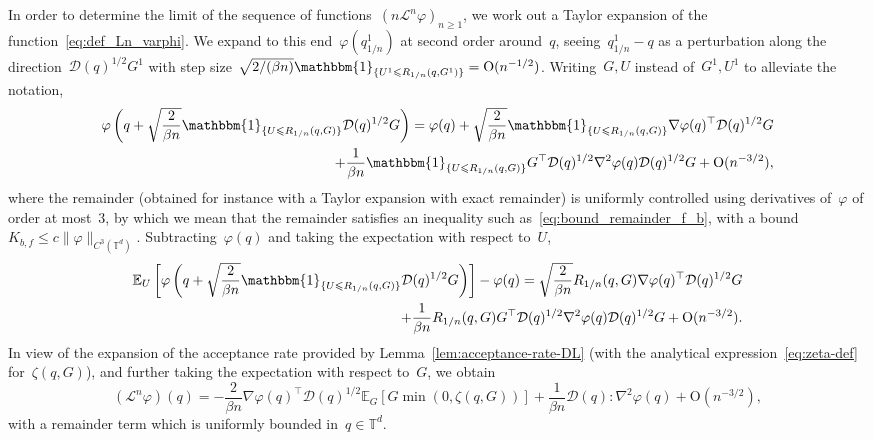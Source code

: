 \documentclass{article}
\renewcommand{\leq}{\leqslant}
\renewcommand{\geq}{\geqslant}
\def\T{\mathbb{T}}
\def\E{\mathbb{E}} %
\newcommand{\Diff}{\mathcal{D}}
\renewcommand{\dim}{d}
\begin{document}
In order to determine the limit of the sequence of functions~$(n\mathcal{L}^{n}\varphi)_{n\geq 1}$, we work out a Taylor expansion of the function~\eqref{eq:def_Ln_varphi}. We expand to this end~$\varphi(q_{1/n}^{1})$ at second order around~$q$, seeing~$q^1_{1/n}-q$ as a perturbation along the direction~$\Diff(q)^{1/2}G^1$ with step size $\sqrt{2/(\beta n)}\mathbbm{1}_{\{U^1\leq R_{1/n}(q,G^1)\}} = \mathrm{O}(n^{-1/2})$. Writing~$G,U$ instead of~$G^1,U^1$ to alleviate the notation, 
\[
\begin{aligned}
  \varphi\left(q+\sqrt{\frac{2}{\beta n}}\mathbbm{1}_{\{U\leq R_{1/n}(q,G)\}}\Diff(q)^{1/2}G\right) = \varphi(q)  + \sqrt{\frac{2}{\beta n}}\mathbbm{1}_{\{U\leq R_{1/n}(q,G)\}}\nabla\varphi(q)^\top\Diff(q)^{1/2}G & \\
+ \frac{1}{\beta n}\mathbbm{1}_{\{U\leq R_{1/n}(q,G)\}} G^\top \Diff(q)^{1/2} \nabla^2\varphi(q)\Diff(q)^{1/2}G + \mathrm{O}(n^{-3/2}), &
\end{aligned}
\]
where the remainder (obtained for instance with a Taylor expansion with exact remainder) is uniformly controlled using derivatives of~$\varphi$ of order at most~3, by which we mean that the remainder satisfies an inequality such as~\eqref{eq:bound_remainder_f_b}, with a bound~$K_{b,f} \leq c \|\varphi\|_{C^3(\T^\dim)}$. Subtracting~$\varphi(q)$ and taking the expectation with respect to~$U$,
\[
\begin{aligned}
\E_U\left[\varphi\left(q+\sqrt{\frac{2}{\beta n}}\mathbbm{1}_{\{U\leq R_{1/n}(q,G)\}}\Diff(q)^{1/2}G\right)\right]-\varphi(q) = \sqrt{\frac{2}{\beta n}} R_{1/n}(q,G)\nabla\varphi(q)^\top\Diff(q)^{1/2}G & \\
+ \frac{1}{\beta n}R_{1/n}(q,G)G^\top \Diff(q)^{1/2} \nabla^2\varphi(q)\Diff(q)^{1/2}G + \mathrm{O}(n^{-3/2}). &
\end{aligned}
\]
In view of the expansion of the acceptance rate provided by Lemma~\ref{lem:acceptance-rate-DL} (with the analytical expression~\eqref{eq:zeta-def} for~$\zeta(q,G)$), and further taking the expectation with respect to~$G$, we obtain
\[
(\mathcal{L}^n \varphi)(q) =
-\frac{2}{\beta n} \nabla\varphi(q)^\top\Diff(q)^{1/2}\E_G[G\min\left(0,\zeta(q,G)\right)] + \frac{1}{\beta n} \Diff(q) : \nabla^2\varphi(q) + \mathrm{O}(n^{-3/2}),
\]
with a remainder term which is uniformly bounded in~$q \in \T^\dim$.
\end{document}
